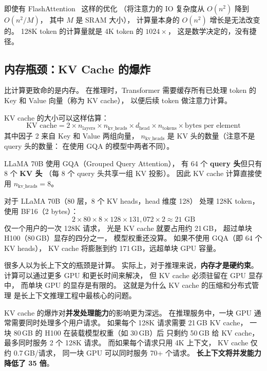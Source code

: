 即使有 FlashAttention~\cite{dao2022flashattention} 这样的优化
（将注意力的 IO 复杂度从 $O(n^2)$ 降到 $O(n^2/M)$，
其中 $M$ 是 SRAM 大小），
计算量本身的 $O(n^2)$ 增长是无法改变的。
128K token 的计算量就是 4K token 的 $1024\times$，
这是数学决定的，没有捷径。

\subsection{内存瓶颈：KV Cache 的爆炸}

比计算更致命的是内存。
在推理时，Transformer 需要缓存所有已处理 token 的
Key 和 Value 向量（称为 KV cache），
以便后续 token 做注意力计算。

KV cache 的大小可以这样估算：
\begin{equation}
  \text{KV cache} = 2 \times n_{\text{layers}} \times n_{\text{kv\_heads}}
  \times d_{\text{head}} \times n_{\text{tokens}} \times \text{bytes per element}
  \label{eq:kv-cache-size}
\end{equation}
其中因子 2 来自 Key 和 Value 两组向量，
$n_{\text{kv\_heads}}$ 是 KV 头的数量（注意不是 query 头的数量：
在使用 GQA 的模型中两者不同）。

LLaMA 70B 使用 GQA（Grouped Query Attention），
有 64 个 \textbf{query 头}但只有 8 个 \textbf{KV 头}
（每 8 个 query 头共享一组 KV 投影）。
因此 KV cache 计算直接使用 $n_{\text{kv\_heads}} = 8$。

对于 LLaMA 70B（80 层，8 个 KV heads，head 维度 128）
处理 128K token，使用 BF16（2 bytes）：
\[
  2 \times 80 \times 8 \times 128 \times 131{,}072 \times 2
  \approx 21 \text{ GB}
\]
仅一个用户的一次 128K 请求，
光是 KV cache 就要占用约 21\,GB，
超过单块 H100（80\,GB）显存的四分之一，
模型权重还没算。
如果不使用 GQA（即 64 个 KV heads），
KV cache 将膨胀到约 171\,GB，远超单块 GPU 容量。

\begin{warnbox}
很多人以为长上下文的瓶颈是计算。
实际上，对于推理来说，\textbf{内存才是硬约束}。
计算可以通过更多 GPU 和更长时间来解决，
但 KV cache 必须驻留在 GPU 显存中，
而单块 GPU 的显存是有限的。
这就是为什么 KV cache 的压缩和分布式管理
是长上下文推理工程中最核心的问题。
\end{warnbox}

KV cache 的爆炸对\textbf{并发处理能力}的影响更为深远。
在推理服务中，一块 GPU 通常需要同时处理多个用户请求。
如果每个 128K 请求需要 21\,GB KV cache，
一块 80\,GB 的 H100 在装载模型权重（如 30\,GB）后
只剩约 50\,GB 给 KV cache，
最多同时服务 2 个 128K 请求。
而如果每个请求只用 4K 上下文，
KV cache 仅约 0.7\,GB/请求，
同一块 GPU 可以同时服务 70+ 个请求。
\textbf{长上下文将并发能力降低了 35 倍}。

